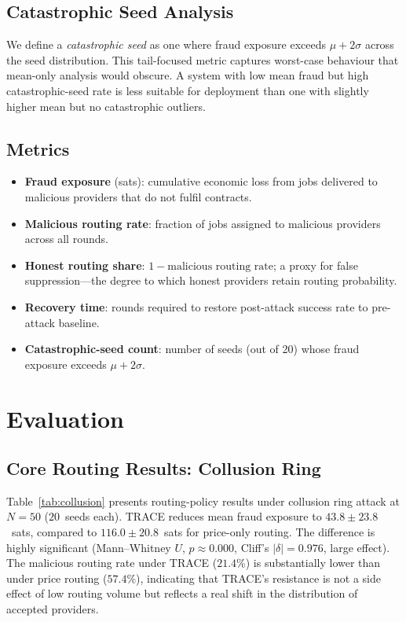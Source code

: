 \documentclass[sigconf,nonacm,10pt]{acmart}
\begin{document}
\subsection{Catastrophic Seed Analysis}

We define a \emph{catastrophic seed} as one where fraud exposure
exceeds $\mu + 2\sigma$ across the seed distribution. This
tail-focused metric captures worst-case behaviour that mean-only
analysis would obscure. A system with low mean fraud but high
catastrophic-seed rate is less suitable for deployment than one
with slightly higher mean but no catastrophic outliers.

\subsection{Metrics}

\begin{itemize}[leftmargin=*,topsep=2pt,itemsep=2pt]
  \item \textbf{Fraud exposure} (sats): cumulative economic loss
        from jobs delivered to malicious providers that do not
        fulfil contracts.
  \item \textbf{Malicious routing rate}: fraction of jobs assigned
        to malicious providers across all rounds.
  \item \textbf{Honest routing share}: $1 - \text{malicious
        routing rate}$; a proxy for false suppression---the degree
        to which honest providers retain routing probability.
  \item \textbf{Recovery time}: rounds required to restore
        post-attack success rate to pre-attack baseline.
  \item \textbf{Catastrophic-seed count}: number of seeds (out of
        20) whose fraud exposure exceeds $\mu + 2\sigma$.
\end{itemize}

\section{Evaluation}
\label{sec:eval}

\subsection{Core Routing Results: Collusion Ring}
\label{sec:eval:collusion}

Table~\ref{tab:collusion} presents routing-policy results under
collusion ring attack at $N = 50$ ($20$~seeds each). TRACE reduces
mean fraud exposure to $43.8 \pm 23.8$~sats, compared to
$116.0 \pm 20.8$~sats for price-only routing. The difference is
highly significant (Mann--Whitney $U$, $p \approx 0.000$, Cliff's
$|\delta| = 0.976$, large effect). The malicious routing rate
under TRACE ($21.4\%$) is substantially lower than under price
routing ($57.4\%$), indicating that TRACE's resistance is not a
side effect of low routing volume but reflects a real shift in
the distribution of accepted providers.
\end{document}
